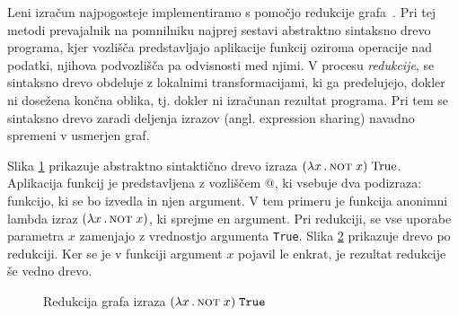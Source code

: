 Leni izračun najpogosteje implementiramo s pomočjo redukcije gra\-fa~\cite{peyton1987implementation, 10.1145/72551.72554}. Pri tej metodi prevajalnik na pomnilniku najprej sestavi abstraktno sintaksno drevo programa, kjer vozlišča predstavljajo aplikacije funkcij oziroma operacije nad podatki, njihova podvozlišča pa odvisnosti med njimi. V procesu \textit{redukcije}, se sintaksno drevo obdeluje z lokalnimi transformacijami, ki ga predelujejo, dokler ni dosežena končna oblika, tj. dokler ni izračunan rezultat programa. Pri tem se sintaksno drevo zaradi deljenja izrazov (angl. expression sharing) navadno spremeni v usmerjen graf.

Slika \ref{fig:redukcija-aplikacije-pred} prikazuje abstraktno sintaktično drevo izraza $(\lambda x \, . \, \textsc{not} \; x) \; \text{True}$. Aplikacija funkcij je predstavljena z vozliščem @, ki vsebuje dva podizraza: funkcijo, ki se bo izvedla in njen argument. V tem primeru je funkcija anonimni lambda izraz $(\lambda x \, . \, \textsc{not} \; x)$, ki sprejme en argument. Pri redukciji, se vse uporabe parametra $x$ zamenjajo z vrednostjo argumenta \texttt{True}. Slika \ref{fig:redukcija-aplikacije-po} prikazuje drevo po redukciji. Ker se je v funkciji argument $x$ pojavil le enkrat, je rezultat redukcije še vedno drevo.

\begin{figure*}[ht]
	\centering
	\begin{subfigure}[b]{0.45\textwidth}
		\centering
		\label{fig:redukcija-aplikacije-pred}
	\end{subfigure}%
	\hfill
	\begin{subfigure}[b]{0.45\textwidth}
		\centering
		\label{fig:redukcija-aplikacije-po}
	\end{subfigure}
	\caption{Redukcija grafa izraza $(\lambda x \, . \, \textsc{not} \; x) \; \texttt{True}$}
	\label{fig:redukcija-aplikacije}
\end{figure*}

